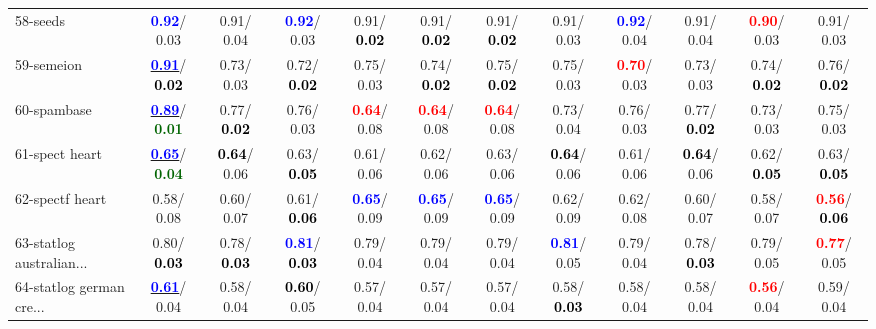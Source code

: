 \begin{table}[h]
\begin{center}
{\begin{tabular}{lc|c|c|c|c|c|c|c|c|c|c}
58-seeds & \textcolor{blue}{\textbf{  0.92}}/  0.03 &   0.91/  0.04 & \textcolor{blue}{\textbf{  0.92}}/  0.03 &   0.91/\textcolor{black}{\textbf{  0.02}} &   0.91/\textcolor{black}{\textbf{  0.02}} &   0.91/\textcolor{black}{\textbf{  0.02}} &   0.91/  0.03 & \textcolor{blue}{\textbf{  0.92}}/  0.04 &   0.91/  0.04 & \textcolor{red}{\textbf{  0.90}}/  0.03 &   0.91/  0.03 \\
59-semeion & \underline{\textcolor{blue}{\textbf{  0.91}}}/\textcolor{black}{\textbf{  0.02}} &   0.73/  0.03 &   0.72/\textcolor{black}{\textbf{  0.02}} &   0.75/  0.03 &   0.74/\textcolor{black}{\textbf{  0.02}} &   0.75/\textcolor{black}{\textbf{  0.02}} &   0.75/  0.03 & \textcolor{red}{\textbf{  0.70}}/  0.03 &   0.73/  0.03 &   0.74/\textcolor{black}{\textbf{  0.02}} &   0.76/\textcolor{black}{\textbf{  0.02}} \\
60-spambase & \underline{\textcolor{blue}{\textbf{  0.89}}}/\textcolor{darkgreen}{\textbf{  0.01}} &   0.77/\textcolor{black}{\textbf{  0.02}} &   0.76/  0.03 & \textcolor{red}{\textbf{  0.64}}/  0.08 & \textcolor{red}{\textbf{  0.64}}/  0.08 & \textcolor{red}{\textbf{  0.64}}/  0.08 &   0.73/  0.04 &   0.76/  0.03 &   0.77/\textcolor{black}{\textbf{  0.02}} &   0.73/  0.03 &   0.75/  0.03 \\ \hline
61-spect heart & \underline{\textcolor{blue}{\textbf{  0.65}}}/\textcolor{darkgreen}{\textbf{  0.04}} & \textcolor{black}{\textbf{  0.64}}/  0.06 &   0.63/\textcolor{black}{\textbf{  0.05}} &   0.61/  0.06 &   0.62/  0.06 &   0.63/  0.06 & \textcolor{black}{\textbf{  0.64}}/  0.06 &   0.61/  0.06 & \textcolor{black}{\textbf{  0.64}}/  0.06 &   0.62/\textcolor{black}{\textbf{  0.05}} &   0.63/\textcolor{black}{\textbf{  0.05}} \\
62-spectf heart &   0.58/  0.08 &   0.60/  0.07 &   0.61/\textcolor{black}{\textbf{  0.06}} & \textcolor{blue}{\textbf{  0.65}}/  0.09 & \textcolor{blue}{\textbf{  0.65}}/  0.09 & \textcolor{blue}{\textbf{  0.65}}/  0.09 &   0.62/  0.09 &   0.62/  0.08 &   0.60/  0.07 &   0.58/  0.07 & \textcolor{red}{\textbf{  0.56}}/\textcolor{black}{\textbf{  0.06}} \\
63-statlog australian... &   0.80/\textcolor{black}{\textbf{  0.03}} &   0.78/\textcolor{black}{\textbf{  0.03}} & \textcolor{blue}{\textbf{  0.81}}/\textcolor{black}{\textbf{  0.03}} &   0.79/  0.04 &   0.79/  0.04 &   0.79/  0.04 & \textcolor{blue}{\textbf{  0.81}}/  0.05 &   0.79/  0.04 &   0.78/\textcolor{black}{\textbf{  0.03}} &   0.79/  0.05 & \textcolor{red}{\textbf{  0.77}}/  0.05 \\
64-statlog german cre... & \underline{\textcolor{blue}{\textbf{  0.61}}}/  0.04 &   0.58/  0.04 & \textcolor{black}{\textbf{  0.60}}/  0.05 &   0.57/  0.04 &   0.57/  0.04 &   0.57/  0.04 &   0.58/\textcolor{black}{\textbf{  0.03}} &   0.58/  0.04 &   0.58/  0.04 & \textcolor{red}{\textbf{  0.56}}/  0.04 &   0.59/  0.04 \\\end{tabular}}\label{stratsBalAcc1a5NN}
\end{center}
\end{table}
